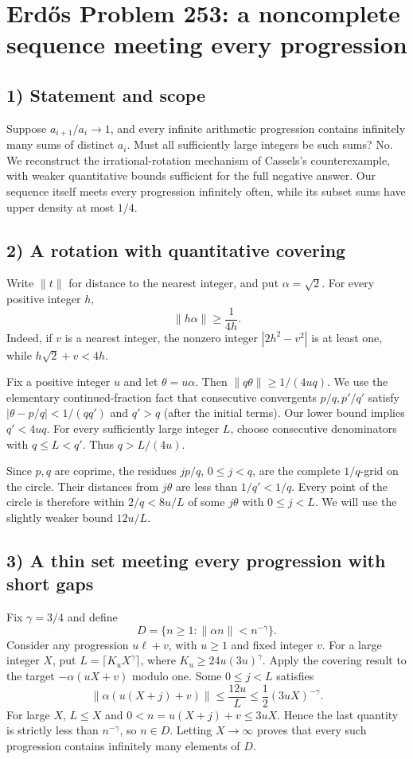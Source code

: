 \section{Erd\H{o}s Problem 253: a noncomplete sequence meeting every progression}

\subsection{1) Statement and scope}
Suppose $a_{i+1}/a_i\to1$, and every infinite arithmetic
progression contains infinitely many sums of distinct $a_i$.
Must all sufficiently large integers be such sums? No.
We reconstruct the irrational-rotation mechanism of Cassels's
counterexample, with weaker quantitative bounds sufficient for
the full negative answer. Our sequence itself meets every
progression infinitely often, while its subset sums have upper
density at most $1/4$.

\subsection{2) A rotation with quantitative covering}
Write $\|t\|$ for distance to the nearest integer, and put
$\alpha=\sqrt2$. For every positive integer $h$,
\[
 \|h\alpha\|\geq\frac1{4h}.
\]
Indeed, if $v$ is a nearest integer, the nonzero integer
$|2h^2-v^2|$ is at least one, while $h\sqrt2+v<4h$.

Fix a positive integer $u$ and let $\theta=u\alpha$.
Then $\|q\theta\|\geq1/(4uq)$.
We use the elementary continued-fraction fact that consecutive
convergents $p/q,p'/q'$ satisfy
$|\theta-p/q|<1/(qq')$ and $q'>q$ (after the initial terms).
Our lower bound implies $q'<4uq$.
For every sufficiently large integer $L$, choose consecutive
denominators with $q\leq L<q'$. Thus $q>L/(4u)$.

Since $p,q$ are coprime, the residues $jp/q$, $0\leq j<q$,
are the complete $1/q$-grid on the circle.
Their distances from $j\theta$ are less than $1/q'<1/q$.
Every point of the circle is therefore within $2/q<8u/L$
of some $j\theta$ with $0\leq j<L$.
We will use the slightly weaker bound $12u/L$.

\subsection{3) A thin set meeting every progression with short gaps}
Fix $\gamma=3/4$ and define
\[
 D=\{n\geq1:\|\alpha n\|<n^{-\gamma}\}.
\]
Consider any progression $u\ell+v$, with $u\geq1$ and fixed
integer $v$. For a large integer $X$, put
$L=\lceil K_uX^\gamma\rceil$, where
$K_u\geq24u(3u)^\gamma$.
Apply the covering result to the target
$-\alpha(uX+v)$ modulo one. Some $0\leq j<L$ satisfies
\[
 \|\alpha(u(X+j)+v)\|
 \leq\frac{12u}{L}
 \leq\frac12(3uX)^{-\gamma}.
\]
For large $X$, $L\leq X$ and
$0<n=u(X+j)+v\leq3uX$. Hence the last quantity is strictly
less than $n^{-\gamma}$, so $n\in D$.
Letting $X\to\infty$ proves that every such progression contains
infinitely many elements of $D$.


